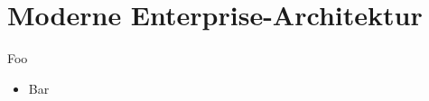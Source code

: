 \section{Moderne Enterprise-Architektur}

\begin{frame}{Foo}
    \begin{itemize}
        \item Bar
    \end{itemize}
\end{frame}
